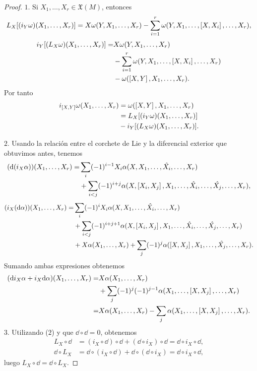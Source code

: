 \begin{proof}\leavevmode

    $1$. Si $X_1,\dots,X_r \in \mathfrak{X}(M)$, entonces
      \begin{equation*}
	L_X[(i_Y \omega) (X_1,\dots,X_r)] = X \omega(Y,X_1,\dots,X_r)-\sum_{i=1}^r \omega(Y,X_1,\dots,\left[X,X_i\right],\dots,X_r), 
      \end{equation*}
      \begin{align*}
	i_Y[(L_X \omega) (X_1,\dots,X_r)] =&  X \omega(Y,X_1,\dots,X_r) \\ 
	& -\sum_{i=1}^r \omega(Y,X_1,\dots,\left[X,X_i\right],\dots,X_r) \\
	&- \omega(\left[X,Y\right],X_1,\dots,X_r).
      \end{align*}
      Por tanto
      \begin{align*}
	i_{\left[X,Y\right]}\omega (X_1,\dots,X_r) &=\omega(\left[X,Y\right],X_1,\dots,X_r) \\
	&= L_X[(i_Y \omega) (X_1,\dots,X_r)] \\
	&-i_Y[(L_X \omega) (X_1,\dots,X_r)].
      \end{align*}

    $2$. Usando la relación entre el corchete de Lie y la diferencial exterior que obtuvimos antes, tenemos
      \begin{align*}
	(\mathrm{d} (i_X \alpha)) (X_1,\dots,X_r) =& \sum_{i}(-1)^{i-1}X_i \alpha(X,X_1,\dots,\hat{X_i},\dots,X_r) \\
	& + \sum_{i<j} (-1)^{i+j} \alpha (X,\left[X_i,X_j\right],X_1,\dots,\hat{X_i},\dots,\hat{X_j},\dots,X_r),
      \end{align*}
      \begin{align*}
	(i_X (\mathrm{d} \alpha)) (X_1,\dots,X_r) =& \sum_{i}(-1)^{i}X_i \alpha(X,X_1,\dots,\hat{X_i},\dots,X_r) \\
	& + \sum_{i<j} (-1)^{i+j+1} \alpha (X,\left[X_i,X_j\right],X_1,\dots,\hat{X_i},\dots,\hat{X_j},\dots,X_r) \\
	& + X\alpha(X_1,\dots,X_r) + \sum_j (-1)^{j} \alpha (\left[X,X_j\right],X_1,\dots,\hat{X_j},\dots,X_r).
      \end{align*}
      Sumando ambas expresiones obtenemos
      \begin{align*}
	(\mathrm{d} i_X \alpha +i_X \mathrm{d} \alpha) (X_1,\dots,X_r) = & X\alpha(X_1,\dots,X_r) \\
	& + \sum_j (-1)^{j} (-1)^{j-1} \alpha (X_1,\dots,\left[X,X_j\right],\dots,X_r) \\
	= & X\alpha(X_1,\dots,X_r) - \sum_j \alpha (X_1,\dots,\left[X,X_j\right],\dots,X_r). 
      \end{align*}
    $3$. Utilizando ($2$) y que $\dd \circ \dd=0$, obtenemos
      \begin{align*}
	L_X \circ \dd &= (i_X \circ \dd) \circ \dd + (\dd \circ i_X) \circ \dd = \dd \circ i_X \circ \dd, \\
	\dd \circ L_X &= \dd \circ (i_X \circ \dd) + \dd \circ (\dd \circ i_X) = \dd \circ i_X \circ \dd,
      \end{align*}
      luego $L_X \circ \dd= \dd \circ L_X$.
\end{proof}

